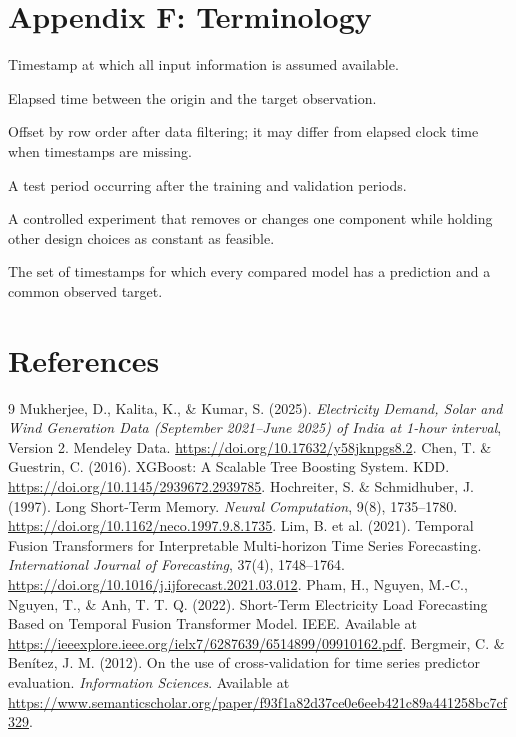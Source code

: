 \documentclass[12pt,a4paper]{article}
\begin{document}
\section{Appendix F: Terminology}
\begin{description}[leftmargin=2.5cm,style=nextline]
\item[Forecast origin] Timestamp at which all input information is assumed available.
\item[Forecast horizon] Elapsed time between the origin and the target observation.
\item[Retained-row horizon] Offset by row order after data filtering; it may differ from elapsed clock time when timestamps are missing.
\item[Chronological holdout] A test period occurring after the training and validation periods.
\item[Component ablation] A controlled experiment that removes or changes one component while holding other design choices as constant as feasible.
\item[Timestamp intersection] The set of timestamps for which every compared model has a prediction and a common observed target.
\end{description}

\section*{References}
\begin{thebibliography}{9}
 Mukherjee, D., Kalita, K., \& Kumar, S. (2025). \textit{Electricity Demand, Solar and Wind Generation Data (September 2021--June 2025) of India at 1-hour interval}, Version 2. Mendeley Data. \url{https://doi.org/10.17632/y58jknpgs8.2}.
 Chen, T. \& Guestrin, C. (2016). XGBoost: A Scalable Tree Boosting System. KDD. \url{https://doi.org/10.1145/2939672.2939785}.
 Hochreiter, S. \& Schmidhuber, J. (1997). Long Short-Term Memory. \textit{Neural Computation}, 9(8), 1735--1780. \url{https://doi.org/10.1162/neco.1997.9.8.1735}.
 Lim, B. et al. (2021). Temporal Fusion Transformers for Interpretable Multi-horizon Time Series Forecasting. \textit{International Journal of Forecasting}, 37(4), 1748--1764. \url{https://doi.org/10.1016/j.ijforecast.2021.03.012}.
 Pham, H., Nguyen, M.-C., Nguyen, T., \& Anh, T. T. Q. (2022). Short-Term Electricity Load Forecasting Based on Temporal Fusion Transformer Model. IEEE. Available at \url{https://ieeexplore.ieee.org/ielx7/6287639/6514899/09910162.pdf}.
 Bergmeir, C. \& Benítez, J. M. (2012). On the use of cross-validation for time series predictor evaluation. \textit{Information Sciences}. Available at \url{https://www.semanticscholar.org/paper/f93f1a82d37ce0e6eeb421c89a441258bc7cf329}.
\end{thebibliography}
\end{document}
